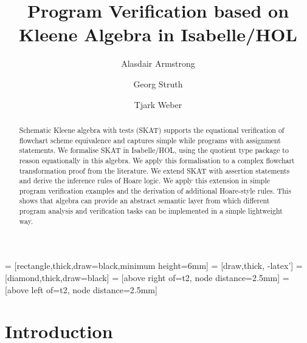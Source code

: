 \documentclass{llncs}
\begin{document}
 = [rectangle,thick,draw=black,minimum height=6mm]
 = [draw,thick, -latex']
 = [diamond,thick,draw=black]
 = [above right of=t2, node distance=2.5mm]
 = [above left of=t2, node distance=2.5mm]

\title{Program Verification based on Kleene Algebra in Isabelle/HOL}

\author{Alasdair Armstrong \and Georg Struth \and Tjark Weber}


\maketitle

\begin{abstract}
  Schematic Kleene algebra with tests (SKAT) supports the equational
  verification of flowchart scheme equivalence and captures simple
  while programs with assignment statements. We formalise SKAT in
  Isabelle/HOL, using the quotient type package to reason equationally
  in this algebra. We apply this formalisation to a complex flowchart
  transformation proof from the literature. We extend SKAT with
  assertion statements and derive the inference rules of Hoare
  logic. We apply this extension in simple program verification
  examples and the derivation of additional Hoare-style rules. This
  shows that algebra can provide an abstract semantic layer from which
  different program analysis and verification tasks can be implemented
  in a simple lightweight way.
\end{abstract}

\pagestyle{plain}


\section{Introduction}
\end{document}
